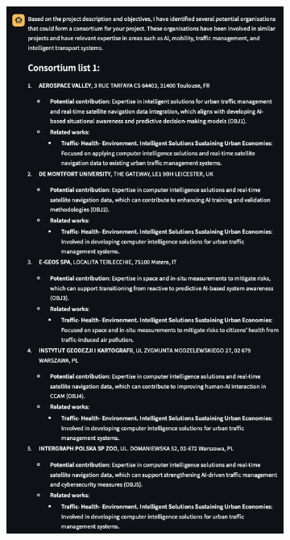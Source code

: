 \begin{figure}[h]
    \centering
    \begin{subfigure}{0.45\textwidth}
        \centering
        \includegraphics[width=.7\textwidth]{figures/implementation/example-consortium-organisations-recommendation-answer-pt1.png}
        \caption{}
        \label{fig:example-consortium-organisations-recommendation-answer-pt1}
    \end{subfigure}
    \hfill
    \begin{subfigure}{0.45\textwidth}
        \centering

\end{subfigure}
\end{figure}
